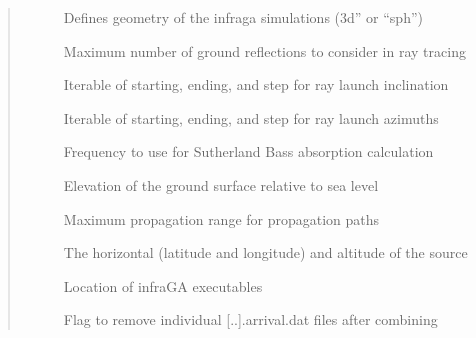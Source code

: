 \documentclass[letterpaper,10pt,english]{sphinxmanual}
\begin{document}
\begin{fulllineitems}
\begin{quote}
\begin{description}
\begin{description}
\item[{}] \leavevmode
\sphinxAtStartPar
Defines geometry of the infraga simulations (3d” or “sph”)

\item[{}] \leavevmode
\sphinxAtStartPar
Maximum number of ground reflections to consider in ray tracing

\item[{}] \leavevmode
\sphinxAtStartPar
Iterable of starting, ending, and step for ray launch inclination

\item[{}] \leavevmode
\sphinxAtStartPar
Iterable of starting, ending, and step for ray launch azimuths

\item[{}] \leavevmode
\sphinxAtStartPar
Frequency to use for Sutherland Bass absorption calculation

\item[{}] \leavevmode
\sphinxAtStartPar
Elevation of the ground surface relative to sea level

\item[{}] \leavevmode
\sphinxAtStartPar
Maximum propagation range for propagation paths

\item[{}] \leavevmode
\sphinxAtStartPar
The horizontal (latitude and longitude) and altitude of the source

\item[{}] \leavevmode
\sphinxAtStartPar
Location of infraGA executables

\item[{}] \leavevmode
\sphinxAtStartPar
Flag to remove individual {[}..{]}.arrival.dat files after combining

\end{description}

\end{description}\end{quote}

\end{fulllineitems}

\end{document}
